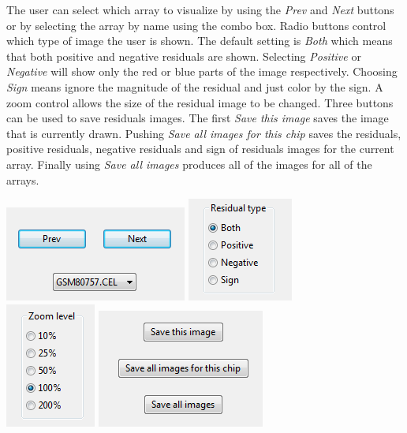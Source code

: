 \documentclass[11pt]{report}
\begin{document}
The user can select which array to visualize by using the {\it Prev} and {\it Next} buttons or by selecting the array by name using the combo box. Radio buttons control which type of image the user is shown. The default setting is {\it Both} which means that both positive and negative residuals are shown. Selecting {\it Positive} or {\it Negative} will show only the red or blue parts of the image respectively. Choosing {\it Sign} means ignore the magnitude of the residual and just color by the sign.  A zoom control allows the size of the residual image to be changed.  Three buttons can be used to save residuals images. The first {\it Save this image} saves the image that is currently drawn. Pushing {\it Save all images for this chip} saves the residuals, positive residuals, negative residuals and sign of residuals images for the current array. Finally using {\it Save all images} produces all of the images for all of the arrays.
\begin{center}
\includegraphics[scale=0.5]{residualsimagescontrol1.png}\hspace{0.5in}
\includegraphics[scale=0.5]{residualsimagescontrol2.png}\\ \vspace{0.2in}
\includegraphics[scale=0.5]{residualsimagescontrol3.png}\hspace{0.5in}
\includegraphics[scale=0.5]{residualsimagescontrol4.png}
\end{center}
\end{document}
